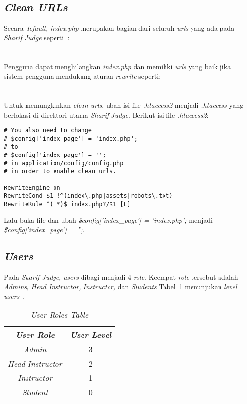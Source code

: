 \subsection{\textit{Clean URLs}}
Secara \textit{default}, \textit{index.php} merupakan bagian dari seluruh \textit{urls} yang ada pada \textit{Sharif Judge} seperti~\cite{mjnaderi:14:sharifjudgedoc}:  \\
 \\
 \\
Pengguna dapat menghilangkan \textit{index.php} dan memiliki \textit{urls} yang baik jika sistem pengguna mendukung aturan \textit{rewrite} seperti: \\ 
\\
\\
Untuk memungkinkan \textit{clean urls}, ubah isi file \textit{.htaccess2} menjadi \textit{.htaccess} yang berlokasi di direktori utama \textit{Sharif Judge}.
Berikut isi file \textit{.htaccess2}: 
\begin{lstlisting}[basicstyle=\ttfamily, frame=single,
columns=fullflexible, keepspaces=true, breaklines=true]
# You also need to change 
# $config['index_page'] = 'index.php';
# to
# $config['index_page'] = '';
# in application/config/config.php
# in order to enable clean urls.

RewriteEngine on
RewriteCond $1 !^(index\.php|assets|robots\.txt)
RewriteRule ^(.*)$ index.php?/$1 [L]
\end{lstlisting}
Lalu buka file  dan ubah \textit{\$config['index\_page'] = 'index.php';} menjadi \textit{\$config['index\_page'] = '';}.

\subsection{\textit{Users}}
Pada \textit{Sharif Judge}, \textit{users} dibagi menjadi 4 \textit{role}. Keempat \textit{role} tersebut adalah \textit{Admins, Head Instructor, Instructor, }dan \textit{Students}
Tabel~\ref{tab:userrole} menunjukan \textit{level users}~\cite{mjnaderi:14:sharifjudgedoc}.

\begin{table}[H] %
	\centering 
	\caption{\textit{User Roles Table}}
	\label{tab:userrole}
	\begin{tabular}{|c|c|}
		\hline
		\textit{\textbf{User Role}} & \textit{\textbf{User Level}} \\
		\hline
		\textit{Admin} & 3 \\
		\hline
		\textit{Head Instructor} & 2 \\
		\hline
		\textit{Instructor} & 1 \\
		\hline
		\textit{Student} & 0 \\
		\hline		
	\end{tabular} 
\end{table}


